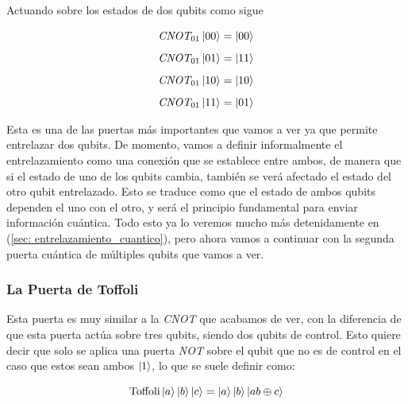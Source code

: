 \documentclass{article}
\numberwithin{equation}{section} %
\begin{document}
    \vspace{2.5mm}

    Actuando sobre los estados de dos qubits como sigue

    \begin{align*}
        \textit{CNOT}_{01} \ket{0 0} &= \ket{0 0} \\[5pt]
        \textit{CNOT}_{01} \ket{0 1} &= \ket{1 1} \\[5pt]
        \textit{CNOT}_{01} \ket{1 0} &= \ket{1 0} \\[5pt]
        \textit{CNOT}_{01} \ket{1 1} &= \ket{0 1}
    \end{align*}

    \vspace{2.5mm}

    Esta es una de las puertas más importantes que vamos a ver ya que permite entrelazar dos qubits. De momento, vamos a definir informalmente el entrelazamiento como una conexión que se establece entre ambos, de manera que si el estado de uno de los qubits cambia, también se verá afectado el estado del otro qubit entrelazado. Esto se traduce como que el estado de ambos qubits dependen el uno con el otro, y será el principio fundamental para enviar información cuántica. Todo esto ya lo veremos mucho más detenidamente en (\ref{sec: entrelazamiento_cuantico}), pero ahora vamos a continuar con la segunda puerta cuántica de múltiples qubits que vamos a ver.

    \vspace{5mm}





    \subsubsection{La Puerta de Toffoli}\label{subsubsection: la_puerta_de_toffoli}

    \vspace{5mm}

    Esta puerta es muy similar a la \textit{CNOT} que acabamos de ver, con la diferencia de que esta puerta actúa sobre tres qubits, siendo dos qubits de control. Esto quiere decir que solo se aplica una puerta \textit{NOT} sobre el qubit que no es de control en el caso que estos sean ambos \( \ket{1} \), lo que se suele definir como:

    \begin{equation*}
        \text{Toffoli} \ket{a} \ket{b} \ket{c} = \ket{a} \ket{b} \ket{a b \oplus c}
    \end{equation*}
\end{document}
